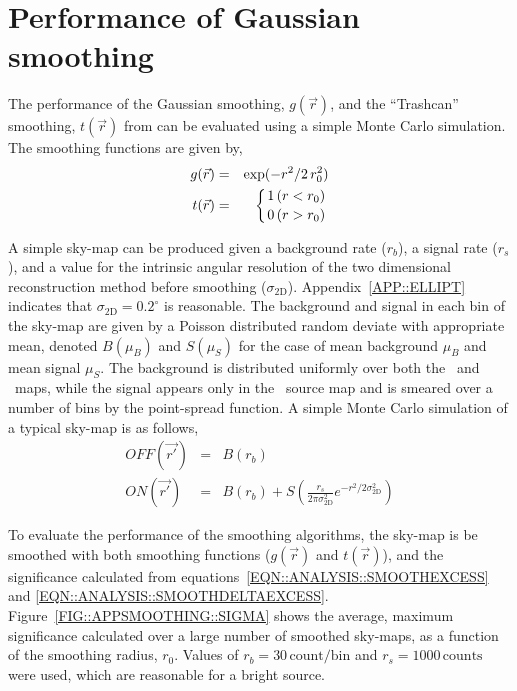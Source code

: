 \chapter{Performance of Gaussian smoothing}
\label{APP::SMOOTHING}

The performance of the Gaussian smoothing, $g(\vec{r})$, and the
``Trashcan'' smoothing, $t(\vec{r})$ from \citet{REF::LESSARD::2001APP}
can be evaluated using a simple Monte Carlo simulation. The 
smoothing functions are given by,
\begin{eqnarray*}
g(\vec{r}) & = & \exp(-r^2/2\,r_0^2) \\
t(\vec{r}) & = & \left\{1\,(r<r_0) \atop 0\,(r>r_0)\right.
\end{eqnarray*}

A simple sky-map can be produced given a background rate ($r_b$), a
\Gray signal rate ($r_s$), and a value for the intrinsic angular 
resolution of the two dimensional reconstruction method before
smoothing ($\sigma_\mathrm{2D}$). Appendix~\ref{APP::ELLIPT} indicates
that $\sigma_\mathrm{2D}=0.2^\circ$ is reasonable. The background and
signal in each bin of the sky-map are given by a Poisson distributed
random deviate with appropriate mean, denoted $B(\mu_B)$ and
$S(\mu_S)$ for the case of mean background $\mu_B$ and mean signal
$\mu_S$. The background is distributed uniformly over both the
\On\ and \Off\ maps, while the signal appears only in
the \On\ source map and is smeared over a number of bins by the
point-spread function. A simple Monte Carlo simulation of a typical
sky-map is as follows,
\begin{eqnarray*}
OFF(\vec{r'}) & = & B(r_b) \\
ON(\vec{r'}) & = & B(r_b) + S\left(\frac{r_s}{2\pi\sigma_\mathrm{2D}^2}e^{-r^2/2\sigma_\mathrm{2D}^2}\right)
\end{eqnarray*}

To evaluate the performance of the smoothing algorithms, the sky-map
is be smoothed with both smoothing functions ($g(\vec{r})$ and
$t(\vec{r})$), and the significance calculated from
equations~\ref{EQN::ANALYSIS::SMOOTHEXCESS} and
\ref{EQN::ANALYSIS::SMOOTHDELTAEXCESS}. Figure~\ref{FIG::APPSMOOTHING::SIGMA}
shows the average, maximum significance calculated over a large number
of smoothed sky-maps, as a function of the smoothing radius, $r_0$.
Values of $r_b=30\,\mathrm{count/bin}$ and $r_s=1000\,\mathrm{counts}$
were used, which are reasonable for a bright source.

